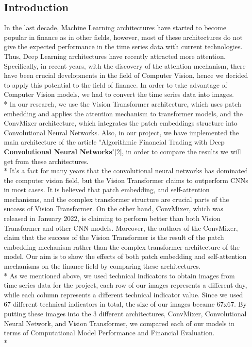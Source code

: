 \documentclass[]{article}
\begin{document}
\begin{center}
    \section{Introduction}
\end{center}
In the last decade, Machine Learning architectures have started to become popular in finance as in other fields, however, most of these architectures do not give the expected performance in the time series data with current technologies. Thus, Deep Learning architectures have recently attracted more attention. Specifically, in recent years, with the discovery of the attention mechanism, there have been crucial developments in the field of Computer Vision, hence we decided to apply this potential to the field of finance. In order to take advantage of Computer Vision models, we had to convert the time series data into images. \vspace{0.0005cm} \\*
In our research, we use the Vision Transformer architecture, which uses patch embedding and applies the attention mechanism to transformer models, and the ConvMixer architecture, which integrates the patch embeddings structure into Convolutional Neural Networks. Also, in our project, we have implemented the main architecture of the article "Algorithmic Financial Trading with Deep \textbf{Convolutional Neural Networks}"[2], in order to compare the results we will get from these architectures. \vspace{0.2cm} \\*
It's a fact for many years that the convolutional neural networks has dominated the computer vision field, but the Vision Transformer claims to outperform CNNs in most cases. It is believed that patch embedding, and self-attention mechanisms, and the complex transformer structure are crucial parts of the success of Vision Transformer. On the other hand, ConvMixer, which was released in January 2022, is claiming to perform better than both Vision Transformer and other CNN models. Moreover, the authors of the ConvMixer, claim that the success of the Vision Transformer is the result of the patch embedding mechanism rather than the complex transformer architecture of the model. Our aim is to show the effects of both patch embedding and self-attention mechanisms on the finance field by comparing these architectures. \vspace{0.2cm} \\*
As we mentioned above, we used technical indicators to obtain images from time series data for the project, each row of our images represents a different day, while each column represents a different technical indicator value. Since we used 67 different technical indicators in total, the size of our images became 67x67. By putting these images into the 3 different architectures, ConvMixer, Convolutional Neural Network, and Vision Transformer, we compared each of our models in terms of Computational Model Performance and Financial Evaluation. \vspace{0.2cm} \\*
\end{document}
